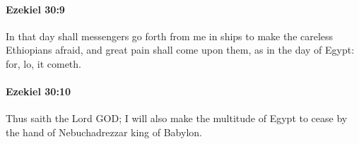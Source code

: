 		\paragraph{Ezekiel 30:9} %
			\label{EZEKIEL-30-9}

			In that day shall messengers go forth from me in ships to make the careless Ethiopians afraid, and great pain shall come upon them, as in the day of Egypt: for, lo, it cometh.


		\paragraph{Ezekiel 30:10} %
			\label{EZEKIEL-30-10}

			Thus saith the Lord GOD; I will also make the multitude of Egypt to cease by the hand of Nebuchadrezzar king of Babylon.


